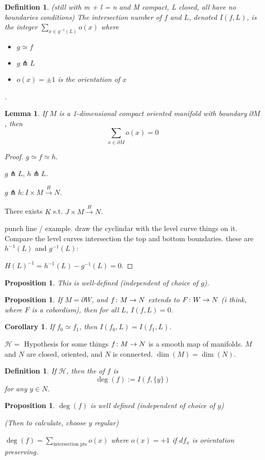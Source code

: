 \documentclass[11pt]{amsbook}
\newenvironment{dateenv}{
	\vspace{1em}
}{
	\vspace{1em}
}
\newcommand{\mydate}[4]{
	\newdate{#1}{#2}{#3}{#4}
	\begin{dateenv}
		\hfill\displaydate{#1}
	\end{dateenv}
}
\theoremstyle{mystyle} %
\newtheorem{defi}[thm]{Definition}
\newtheorem{coro}[thm]{Corollary}
\newtheorem{propo}[thm]{Proposition}
\newtheorem{lemm}[thm]{Lemma}
\numberwithin{thm}{section}
\newcommand{\homotopic}{\simeq}
\renewcommand{\d}{\partial}
\newcommand{\transverse}{\pitchfork}
\newcommand{\x}{\times}
\begin{document}
\begin{defi}
	(still with m + l = n and M compact, L closed, all have no boundaries conditions)
	The \emph{intersection number} of $f$ and $L$, denoted $I(f, L)$, is the integer $\sum_{x \in g^{-1}(L)} o(x)$ where
	\begin{itemize}
		\item $g \homotopic f$
		\item $g \transverse L$
		\item $o(x) = \pm 1$ is the orientation of $x$
	\end{itemize}.
\end{defi}
\begin{lemm}
	If $M$ is a 1-dimensional compact oriented manifold with boundary $\d M$, then $$\sum_{x \in \d M} o(x) = 0$$
\end{lemm}
\begin{proof}
	$g \homotopic f \homotopic h$.

	$g \transverse L$, $h \transverse L$.

	$g \transverse h : I \x M \overset{H}{\to} N$.

	There exists $K$ s.t. $J \x M \overset{\overset{~}{H}}{\to} N$.

	punch line / example.  draw the cyclindar with the level curve things on it.  Compare the level curves intersection the top and bottom boundaries.  these are $h^{-1}(L)$ and $g^{-1}(L)$:

	$\overset{~}{H}(L)^{-1} = h^{-1}(L) - g^{-1}(L) = 0$.
\end{proof}

\mydate{d17}{21}{11}{2016}

\begin{propo}
	This is well-defined (independent of choice of $g$).
\end{propo}
\begin{propo}
	If $M = \d W$, and $f\colon M \to N$ extends to $F\colon W \to N$ (i think, where $F$ is a cobordism), then for all $L$, $I(f,L) = 0$.
\end{propo}
\begin{coro}
	If $f_0 \homotopic f_1$, then $I(f_0, L) = I(f_1, L)$.
\end{coro}

$\mathcal{H} = $ Hypothesis for some things  $f \colon M \to N$ is a smooth map of manifolds.  $M$ and $N$ are closed, oriented, and $N$  is connected.  $\dim(M) = \dim(N)$.

\begin{defi}
	If $\mathcal{H}$, then the  of $f$ is $$\deg(f) := I(f, \{y\})$$ for any $y \in N$.
\end{defi}
\begin{propo}
	$\deg(f)$ is well defined (independent of choice of $y$)

	(Then to calculate, choose $y$ regular)

	$\deg(f) = \sum_{\text{intersection pts}} o(x)$ where $o(x) = +1$ if $df_x$ is orientation preserving.
\end{propo}
\end{document}
